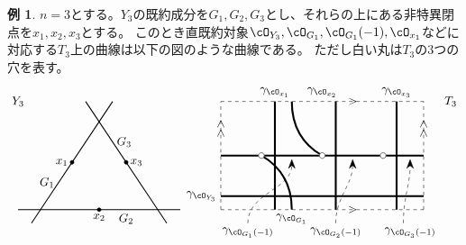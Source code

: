 \documentclass[uplatex,a4paper,dvipdfmx]{jsarticle}
\theoremstyle{plain}
\theoremstyle{definition}
\newtheorem{example}[theorem]{例}
\begin{document}
\begin{example}\label{correspondence_of_objects}
	$n=3$とする。$Y_3$の既約成分を$G_1, G_2, G_3$とし、それらの上にある非特異閉点を$x_1, x_2, x_3$とする。
	このとき直既約対象$\cO_{Y_3}, \cO_{G_1}, \cO_{G_1}(-1), \cO_{x_1}$などに対応する$T_3$上の曲線は以下の図のような曲線である。
	ただし白い丸は$T_3$の$3$つの穴を表す。
	\begin{displaymath}
		\begin{tikzpicture}[scale = 0.4]
			\draw(-10, 8) node{$Y_3$};
			\draw[thick] (-9,-1)--(-3,8);
			\draw[thick] (-10,0)--(2,0);
			\draw[thick] (1,-1)--(-5,8);

			\filldraw[black] (-6, 3.5) circle (4pt);
			\filldraw[black] (-4, 0) circle (4pt);
			\filldraw[black] (-2, 3.5) circle (4pt);

			\draw(-6, 3.5) node[left]{$x_1$};
			\draw(-4, 0) node[below]{$x_2$};
			\draw(-2, 3.5) node[right]{$x_3$};

			\draw(-7, 2) node[left]{$G_1$};
			\draw(-2, 0) node[below]{$G_2$};
			\draw(-3, 5) node[right]{$G_3$};

			\draw(22, 8) node{$T_3$};
			\draw[dashed] (5,0)--(20,0);
			\draw(14.75, 0) node{$>$};
			\draw[dashed] (5,0)--(5,8);
			\draw(5, 6) node{\rotatebox{90}{$>>$}};
			\draw[dashed] (5,8)--(20,8);
			\draw(14.75, 8) node{$>$};
			\draw[dashed] (20,0)--(20,8);
			\draw(20, 6) node{\rotatebox{90}{$>>$}};

			\draw[ultra thick] (5, 1)--(20, 1);
			\draw[ultra thick] (5, 4)--(20, 4);
			\draw(5, 1) node[left]{$\gamma_{\cO_{Y_3}}$};


			\draw[ultra thick] (8+1, 0)--(8+1, 8);
			\draw(8+1, 8) node[above]{$\gamma_{\cO_{x_1}}$};
			\draw[ultra thick] (12.5+1, 0)--(12.5+1, 8);
			\draw(12.5, 8) node[above]{$\gamma_{\cO_{x_2}}$};
			\draw[ultra thick] (17+1, 0)--(17+1, 8);
			\draw(17+1, 8) node[above]{$\gamma_{\cO_{x_3}}$};

			\draw[ultra thick] (8, 4) to[out=-30,in=90] (10.25, 0);
			\draw[ultra thick] (10.25, 8) to[out=-90,in=150] (12.5, 4);
			\draw(10.25, 0) node[below]{$\gamma_{\cO_{G_1}}$};
			\foreach \u in {8, 12.5, 17}
				{
					\filldraw[white] (\u, 4) circle (6pt);
					\draw[black] (\u, 4) circle (6pt);
				}

			\draw[dashed, -{Stealth[length=3mm]}] (7, -1) to[out=90, in=-90] (10.25, 3.75);
			\draw(7, -1) node[below]{$\gamma_{\cO_{G_1}(-1)}$};
			\draw[dashed, -{Stealth[length=3mm]}] (13.5, -1) to[out=90, in=-90] (14.75, 3.75);
			\draw(13.5, -1) node[below]{$\gamma_{\cO_{G_2}(-1)}$};
			\draw[dashed, -{Stealth[length=3mm]}] (18.5, -1) to[out=90, in=-90] (19, 3.75);
			\draw(19, -1) node[below]{$\gamma_{\cO_{G_3}(-1)}$};


\end{tikzpicture}
\end{displaymath}
\end{example}
\end{document}
